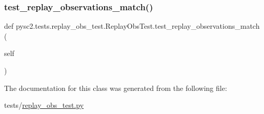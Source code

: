 \subsubsection{\texorpdfstring{test\+\_\+replay\+\_\+observations\+\_\+match()}{test\_replay\_observations\_match()}}
{\footnotesize\ttfamily def pysc2.\+tests.\+replay\+\_\+obs\+\_\+test.\+Replay\+Obs\+Test.\+test\+\_\+replay\+\_\+observations\+\_\+match (\begin{DoxyParamCaption}\item[{}]{self }\end{DoxyParamCaption})}



The documentation for this class was generated from the following file\+:\begin{DoxyCompactItemize}
\item 
tests/\mbox{\hyperlink{replay__obs__test_8py}{replay\+\_\+obs\+\_\+test.\+py}}\end{DoxyCompactItemize}
